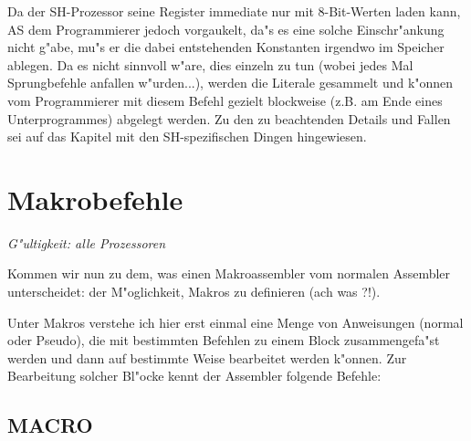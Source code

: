 \documentclass[12pt,a4paper,twoside]{report}
\makeatletter
\newcommand{\ttindex}[1]{\index{#1@{\tt #1}}}
\newcommand{\asname}{AS}
\makeatother
\begin{document}
Da der SH-Prozessor seine Register immediate nur mit 8-Bit-Werten
laden kann, \asname{} dem Programmierer jedoch vorgaukelt, da"s es eine solche
Einschr"ankung nicht g"abe, mu"s er die dabei entstehenden Konstanten
irgendwo im Speicher ablegen.  Da es nicht sinnvoll w"are, dies einzeln
zu tun (wobei jedes Mal Sprungbefehle anfallen w"urden...), werden die
Literale gesammelt und k"onnen vom Programmierer mit diesem Befehl
gezielt blockweise (z.B. am Ende eines Unterprogrammes) abgelegt werden.
Zu den zu beachtenden Details und Fallen sei auf das Kapitel mit den
SH-spezifischen Dingen hingewiesen.


\section{Makrobefehle}

{\em G"ultigkeit: alle Prozessoren}

Kommen wir nun zu dem, was einen Makroassembler vom normalen Assembler
unterscheidet: der M"oglichkeit, Makros zu definieren (ach was ?!).
\par
Unter Makros verstehe ich hier erst einmal eine Menge von Anweisungen
(normal oder Pseudo), die mit bestimmten Befehlen zu einem Block
zusammengefa"st werden und dann auf bestimmte Weise bearbeitet
werden k"onnen.  Zur Bearbeitung solcher Bl"ocke kennt der Assembler
folgende Befehle:


\subsection{MACRO}
\ttindex{MACRO}\ttindex{ENDM}
\label{SectMacros}
\end{document}
